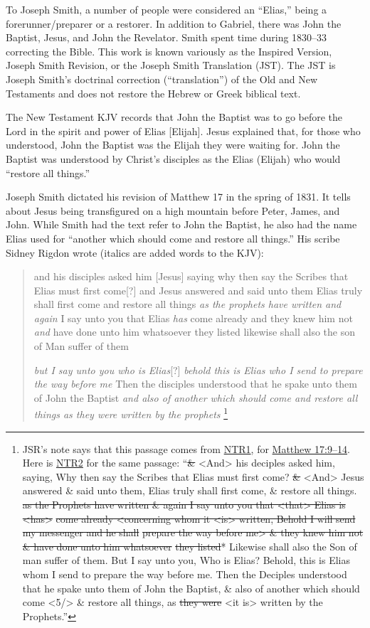 		To Joseph Smith, a number of people were considered an ``Elias,'' being a forerunner/preparer or a restorer. In addition to Gabriel, there was John the Baptist, Jesus, and John the Revelator. Smith spent time during 1830--33 correcting the Bible. This work is known variously as the Inspired Version, Joseph Smith Revision, or the Joseph Smith Translation (JST). The JST is Joseph Smith's doctrinal correction (``translation'') of the Old and New Testaments and does not restore the Hebrew or Greek biblical text.

		The New Testament KJV records that John the Baptist was to go before the Lord in the spirit and power of Elias [Elijah]. Jesus explained that, for those who understood, John the Baptist was the Elijah they were waiting for. John the Baptist was understood by Christ's disciples as the Elias (Elijah) who would ``restore all things.''

		Joseph Smith dictated his revision of Matthew 17 in the spring of 1831. It tells about Jesus being transfigured on a high mountain before Peter, James, and John. While Smith had the text refer to John the Baptist, he also had the name Elias used for ``another which should come and restore all things.'' His scribe Sidney Rigdon wrote (italics are added words to the KJV):
		
		\begin{quote}
			and his disciples asked him [Jesus] saying why then say the Scribes that Elias must first come[?] and Jesus answered and said unto them Elias truly shall first come and restore all things \textit{as the prophets have written and again} I say unto you that Elias \textit{has} come already and they knew him not \textit{and} have done unto him whatsoever they listed likewise shall also the son of Man suffer of them

			\textit{but I say unto you who is Elias}[?] \textit{behold this is Elias who I send to prepare the way before me} Then the disciples understood that he spake unto them of John the Baptist \textit{and also of another which should come and restore all things as they were written by the prophets}%
				\footnote{%
					JSR's note says that this passage comes from \hyperref[JST-NTR1]{NTR1}, for \hyperref[MATTHEW-17-9]{Matthew 17:9--14}. Here is \hyperref[JST-NTR2]{NTR2} for the same passage: ``\sout{\&} <And> his deciples asked him, saying, Why then say the Scribes that Elias must first come? \sout{\&} <And> Jesus answered \& said unto them, Elias truly shall first come, \& restore all things. \sout{as the Prophets have written \& again I say unto you that <that> Elias is <has>} \sout{come already <concerning whom it <is> written, Behold I will send my messenger and he shall} \sout{prepare the way before me> \& they knew him not \& have done unto him whatsoever} \sout{they listed}* Likewise shall also the Son of man suffer of them. But I say unto you, Who is Elias? Behold, this is Elias whom I send to prepare the way before me. Then the Deciples understood that he spake unto them of John the Baptist, \& also of another which should come <5/> \& restore all things, as \sout{they were} <it is> written by the Prophets.''
					}
		\end{quote}

